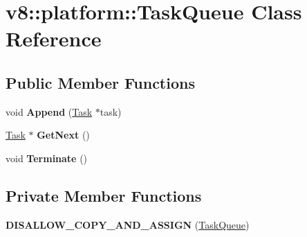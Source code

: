 \hypertarget{classv8_1_1platform_1_1_task_queue}{}\section{v8\+:\+:platform\+:\+:Task\+Queue Class Reference}
\label{classv8_1_1platform_1_1_task_queue}
\subsection*{Public Member Functions}
\begin{DoxyCompactItemize}
\item 
void {\bfseries Append} (\hyperlink{classv8_1_1_task}{Task} $\ast$task)\hypertarget{classv8_1_1platform_1_1_task_queue_a14698b4a00c503b5a1103c180f1d6126}{}\label{classv8_1_1platform_1_1_task_queue_a14698b4a00c503b5a1103c180f1d6126}

\item 
\hyperlink{classv8_1_1_task}{Task} $\ast$ {\bfseries Get\+Next} ()\hypertarget{classv8_1_1platform_1_1_task_queue_af9d42325eacac42bfa2e25afe9604169}{}\label{classv8_1_1platform_1_1_task_queue_af9d42325eacac42bfa2e25afe9604169}

\item 
void {\bfseries Terminate} ()\hypertarget{classv8_1_1platform_1_1_task_queue_a603c0ef6966c3365db6904199488e978}{}\label{classv8_1_1platform_1_1_task_queue_a603c0ef6966c3365db6904199488e978}

\end{DoxyCompactItemize}
\subsection*{Private Member Functions}
\begin{DoxyCompactItemize}
\item 
{\bfseries D\+I\+S\+A\+L\+L\+O\+W\+\_\+\+C\+O\+P\+Y\+\_\+\+A\+N\+D\+\_\+\+A\+S\+S\+I\+GN} (\hyperlink{classv8_1_1platform_1_1_task_queue}{Task\+Queue})\hypertarget{classv8_1_1platform_1_1_task_queue_ae2a89e6876b657cc3fbc4cff2c247ecd}{}\label{classv8_1_1platform_1_1_task_queue_ae2a89e6876b657cc3fbc4cff2c247ecd}

\end{DoxyCompactItemize}
